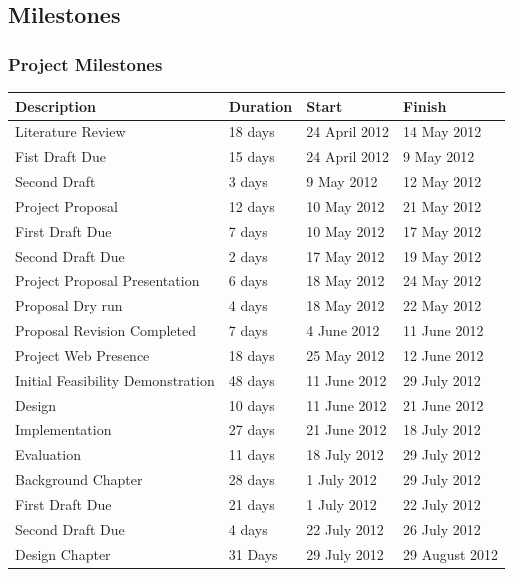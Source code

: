 \documentclass[12pt,a4paper]{article}
\begin{document}
\subsection{Milestones}
\subsubsection{Project Milestones}

\begin{tabular}{l||l|l|l}
    Description & Duration & Start & Finish \\
    \hline  \hline
    Literature Review & 18 days & 24 April 2012 & 14 May 2012 \\
    \indent Fist Draft Due & 15 days  & 24 April 2012  & 9 May 2012  \\
    \indent Second Draft & 3 days & 9 May 2012 & 12 May 2012 \\
    \hline
    Project Proposal & 12 days & 10 May 2012  & 21 May 2012 \\
    \indent First Draft Due & 7 days & 10 May 2012 & 17 May 2012 \\
    \indent Second Draft Due & 2 days  & 17 May 2012  & 19 May 2012 \\
    \hline
    Project Proposal Presentation & 6 days  & 18 May 2012 & 24 May 2012 \\
    \indent Proposal Dry run & 4 days & 18 May 2012 & 22 May 2012 \\
    \hline
    Proposal Revision Completed & 7 days & 4 June 2012 & 11 June 2012 \\
    \hline
    Project Web Presence & 18 days  & 25 May 2012 & 12 June 2012 \\
    \hline
    Initial Feasibility Demonstration & 48 days & 11 June 2012 & 29 July 2012 \\
    \indent Design & 10 days & 11 June 2012 & 21 June 2012 \\
    \indent Implementation & 27 days & 21 June 2012 & 18 July 2012 \\
    \indent Evaluation & 11 days & 18 July 2012 & 29 July 2012 \\
    \hline
    Background Chapter & 28 days & 1 July 2012  & 29 July 2012 \\
    \indent First Draft Due & 21 days & 1 July 2012 & 22 July 2012 \\
    \indent Second Draft Due & 4 days  & 22 July 2012 & 26 July 2012 \\
    \hline
    Design Chapter & 31 Days & 29 July 2012 & 29 August 2012 \\

\end{tabular}
\end{document}
